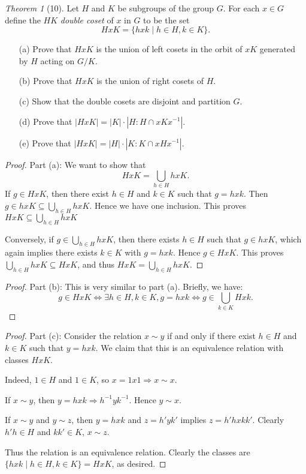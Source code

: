 \documentclass[12pt]{article}
\theoremstyle{remark}
\theoremstyle{named}
\newtheorem*{theorem}{Theorem}
\renewcommand{\implies}{\Rightarrow}
\begin{document}
\begin{theorem}[10]
    Let \(H\) and \(K\) be subgroups of the group \(G\). For each \(x \in G\) define the \(HK\) \textit{double coset} of \(x\) in \(G\) to be the set
    \[HxK = \{hxk \mid h \in H, k \in K\}.\]
    \begin{enumerate}
        \item[(a)] Prove that \(HxK\) is the union of left cosets in the orbit of \(xK\) generated by \(H\) acting on \(G / K\).
        \item[(b)] Prove that \(HxK\) is the union of right cosets of \(H\).
        \item[(c)] Show that the double cosets are disjoint and partition \(G\).
        \item[(d)] Prove that \(|HxK| = |K|\cdot |H : H \cap x K x^{-1}|\).
        \item[(e)] Prove that \(|HxK| = |H| \cdot |K : K \cap x H x^{-1}|\).
    \end{enumerate}
\end{theorem}

\begin{proof}
    Part (a): We want to show that
    \[HxK = \bigcup_{h \in H} hxK.\]
    If \(g \in HxK\), then there exist \(h \in H\) and \(k \in K\) such that \(g = hxk\). Then \(g \in hxK \subseteq \bigcup_{h \in H} hxK\). Hence we have one inclusion. This proves \(HxK \subseteq \bigcup_{h \in H} hxK\)

    Conversely, if \(g \in \bigcup_{h \in H} hxK\), then there exists \(h \in H\) such that \(g \in hxK\), which again implies there exists \(k \in K\) with \(g = hxk\). Hence \(g \in HxK\). This proves \(\bigcup_{h \in H} hxK \subseteq HxK\), and thus \(HxK = \bigcup_{h \in H} hxK\).
\end{proof}

\begin{proof}
    Part (b): This is very similar to part (a). Briefly, we have:
    \[g \in HxK \iff \exists h \in H, k \in K, g = hxk \iff g \in \bigcup_{k \in K} Hxk.\]
\end{proof}

\begin{proof}
    Part (c): Consider the relation \(x \sim y\) if and only if there exist \(h \in H\) and \(k \in K\) such that \(y = hxk\). We claim that this is an equivalence relation with classes \(HxK\). 

    Indeed, \(1 \in H\) and \(1 \in K\), so \(x = 1x1 \implies x \sim x\). 

    If \(x \sim y\), then \(y = hxk \implies h^{-1} y k^{-1}\). Hence \(y \sim x\). 

    If \(x \sim y\) and \(y \sim z\), then \(y = hxk\) and \(z = h'yk'\) implies \(z = h'hxkk'\). Clearly \(h'h \in H\) and \(kk' \in K\), \(x \sim z\).
    
    Thus the relation is an equivalence relation. Clearly the classes are \(\{hxk \mid h \in H, k \in K\} = HxK\), as desired.
\end{proof}
\end{document}
